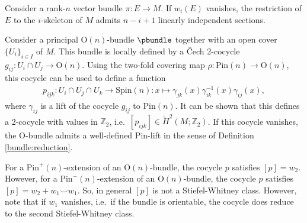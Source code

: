 
    \begin{property}
        Consider a rank-$n$ vector bundle $\pi:E\rightarrow M$. If $w_i(E)$ vanishes, the restriction of $E$ to the $i$-skeleton of $M$ admits $n-i+1$ linearly independent sections.
    \end{property}

    Consider a principal $\mathrm{O}(n)$-bundle $\pbundle$ together with an open cover $\{U_i\}_{i\in I}$ of $M$. This bundle is locally defined by a \v{C}ech 2-cocycle $g_{ij}:U_i\cap U_j\rightarrow\mathrm{O}(n)$. Using the two-fold covering map $\rho:\mathrm{Pin}(n)\rightarrow\mathrm{O}(n)$, this cocycle can be used to define a function
    \begin{gather}
        p_{ijk}:U_i\cap U_j\cap U_k\rightarrow\mathrm{Spin}(n):x\mapsto\gamma_{jk}(x)\gamma^{-1}_{ik}(x)\gamma_{ij}(x),
    \end{gather}
    where $\gamma_{ij}$ is a lift of the cocycle $g_{ij}$ to $\mathrm{Pin}(n)$. It can be shown that this defines a 2-cocycle with values in $\mathbb{Z}_2$, i.e.~$[p_{ijk}]\in\check{H}^2(M;\mathbb{Z}_2)$. If this cocycle vanishes, the $\mathrm{O}$-bundle admits a well-defined $\mathrm{Pin}$-lift in the sense of Definition \ref{bundle:reduction}.

    \begin{property}
        For a $\mathrm{Pin}^+(n)$-extension of an $\mathrm{O}(n)$-bundle, the cocycle $p$ satisfies $[p]=w_2$. However, for a $\mathrm{Pin}^-(n)$-extension of an $\mathrm{O}(n)$-bundle, the cocycle $p$ satisfies $[p]=w_2+w_1\smile w_1$. So, in general $[p]$ is not a Stiefel-Whitney class. However, note that if $w_1$ vanishes, i.e.~if the bundle is orientable, the cocycle does reduce to the second Stiefel-Whitney class.
    \end{property}

